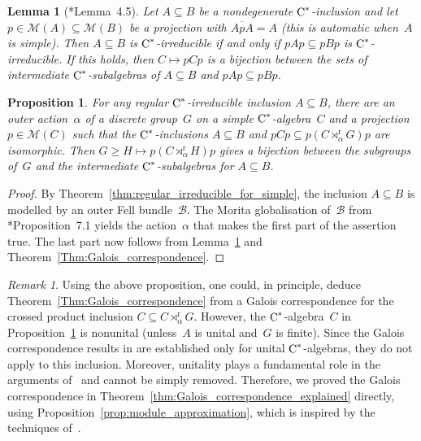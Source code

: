 \documentclass[a4paper]{amsart}
\theoremstyle{plain}
\newtheorem{lemma}[theorem]{Lemma}
\newtheorem{proposition}[theorem]{Proposition}
\theoremstyle{definition}
\theoremstyle{remark}
\newtheorem{remark}[theorem]{Remark}
\numberwithin{theorem}{section}
\numberwithin{equation}{section}
\newcommand*{\nb}{\nobreakdash}
\newcommand*{\red}{\mathrm{r}}%
\newcommand*{\Cst}{\textup C^*}%
\newcommand*{\Mult}{\mathcal M}%
\begin{document}
\begin{lemma}[\cite{Echterhoff-Rordam:Inclusions}*{Lemma~4.5}]
  \label{lem:Mortita_for_irreducibles}
  Let \(A\subseteq B\) be a nondegenerate \(\Cst\)\nb-inclusion and
  let \(p\in \Mult(A)\subseteq \Mult(B)\) be a projection with
  \(\overline{ApA}=A\) \textup{(}this is automatic when~\(A\) is
  simple\textup{)}.
  Then \(A\subseteq B\) is \(\Cst\)\nb-irreducible if and only if
  \(pAp\subseteq pBp\) is \(\Cst\)\nb-irreducible.
  If this holds, then \(C\mapsto pCp\) is a bijection between the sets
  of intermediate \(\Cst\)\nb-subalgebras of \(A\subseteq B\) and
  \(pAp\subseteq pBp\).
\end{lemma}

\begin{proposition}
  \label{prop:Morita_globalisation}
  For any regular \(\Cst\)\nb-irreducible inclusion \(A\subseteq B\),
  there are an outer action~\(\alpha\) of a discrete group~\(G\) on a
  simple \(\Cst\)\nb-algebra~\(C\) and a projection \(p\in \Mult(C)\)
  such that the \(\Cst\)\nb-inclusions \(A\subseteq B\) and
  \(pCp\subseteq p(C\rtimes^\red_\alpha  G)p\) are isomorphic.
  Then \(G\ge H\mapsto  p(C\rtimes^\red_\alpha  H)p\) gives
  a bijection between the subgroups of~\(G\) and the intermediate
  \(\Cst\)\nb-subalgebras for \(A\subseteq B\).
\end{proposition}

\begin{proof}
  By Theorem~\ref{thm:regular_irreducible_for_simple}, the inclusion
  \(A\subseteq B\) is modelled by an outer Fell
  bundle~\(\mathcal{B}\).
  The Morita globalisation of~\(\mathcal{B}\) from
  \cite{Kwasniewski-Meyer:Aperiodicity}*{Proposition~7.1} yields the
  action~\(\alpha\) that makes the first part of the assertion true.
  The last part now follows from
  Lemma~\ref{lem:Mortita_for_irreducibles} and
  Theorem~\ref{Thm:Galois_correspondence}.
\end{proof}

\begin{remark}
  Using the above proposition, one could, in principle, deduce
  Theorem~\ref{Thm:Galois_correspondence} from a Galois correspondence
  for the crossed product inclusion \(C\subseteq  C\rtimes^\red_\alpha
  G\).
  However, the \(\Cst\)\nb-algebra~\(C\) in
  Proposition~\ref{prop:Morita_globalisation} is  nonunital
  (unless~\(A\) is  unital and~\(G\) is finite).
  Since the Galois correspondence results in \cites{Cameron-Smith:Galois_reduced,
    Kennedy-Ursu:Intermediate_subalgebras_crossed} are established
  only for unital \(\Cst\)\nb-algebras, they do not apply to this inclusion.
  Moreover, unitality plays a fundamental role in the arguments
  of~\cite{Cameron-Smith:Galois_reduced} and cannot be simply removed.
  Therefore, we proved the Galois correspondence in
  Theorem~\ref{thm:Galois_correspondence_explained} directly, using
  Proposition~\ref{prop:module_approximation}, which is inspired by
  the techniques
  of~\cite{Kennedy-Ursu:Intermediate_subalgebras_crossed}.
\end{remark}
\end{document}
